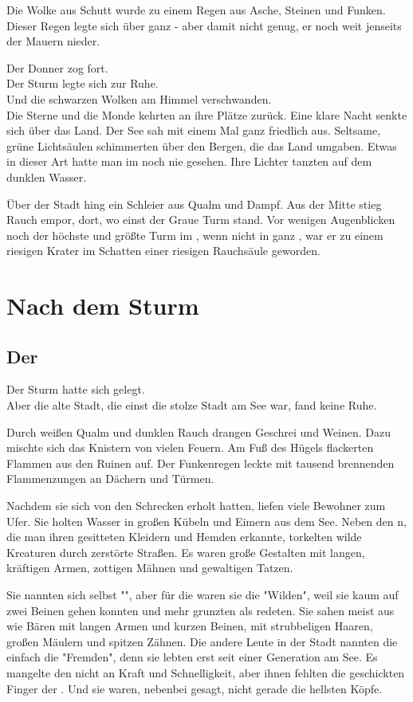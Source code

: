 \begin{huge}
\begin{itshape}
Die Wolke aus Schutt wurde zu einem Regen aus Asche, Steinen und Funken. Dieser Regen legte sich über ganz {\Tern} - aber damit nicht genug, er noch weit jenseits der Mauern nieder.

Der Donner zog fort.\\
Der Sturm legte sich zur Ruhe.\\
Und die schwarzen Wolken am Himmel verschwanden.\\
Die Sterne und die Monde kehrten an ihre Plätze zurück. 
Eine klare Nacht senkte sich über das Land. Der See sah mit einem Mal ganz friedlich aus. Seltsame, grüne Lichtsäulen schimmerten über den Bergen, die das Land umgaben. Etwas in dieser Art hatte man im {\Enland} noch nie gesehen. Ihre Lichter tanzten auf dem dunklen Wasser. 

Über der Stadt hing ein Schleier aus Qualm und Dampf. Aus der Mitte stieg Rauch empor, dort, wo einst der Graue Turm stand. Vor wenigen Augenblicken noch der höchste und größte Turm im {\Enland}, wenn nicht in ganz {\Rhingell}, war er zu einem riesigen Krater im Schatten einer riesigen Rauchsäule geworden.
\end{itshape}

\part{Nach dem Sturm}
\chapter{Der \Schattenlaufer}
Der Sturm hatte sich gelegt.\\
Aber die alte Stadt, die einst die stolze Stadt {\Tern} am See war, fand keine Ruhe.
 
Durch weißen Qualm und dunklen Rauch drangen Geschrei und Weinen. Dazu mischte sich das Knistern von vielen Feuern. Am Fuß des Hügels flackerten Flammen aus den Ruinen auf. Der Funkenregen leckte mit tausend brennenden Flammenzungen an Dächern und Türmen. 

Nachdem sie sich von den Schrecken erholt hatten, liefen viele Bewohner zum Ufer. Sie holten Wasser in großen Kübeln und Eimern aus dem See. Neben den {\Enlaender}{n}, die man ihren gesitteten Kleidern und Hemden erkannte, torkelten wilde Kreaturen durch zerstörte Straßen. Es waren große Gestalten mit langen, kräftigen Armen, zottigen Mähnen und gewaltigen Tatzen.

Sie nannten sich selbst "{\Bangiri}", aber für die {\Enlaender} waren sie die "Wilden", weil sie kaum auf zwei Beinen gehen konnten und mehr grunzten als redeten. Sie sahen meist aus wie Bären mit langen Armen und kurzen Beinen, mit strubbeligen Haaren, großen Mäulern und spitzen Zähnen. Die andere Leute in der Stadt nannten die {\Bangiri} einfach die "Fremden", denn sie lebten erst seit einer Generation am See. Es mangelte den {\Bangiri} nicht an Kraft und Schnelligkeit, aber ihnen fehlten die geschickten Finger der . Und sie waren, nebenbei gesagt, nicht gerade die hellsten Köpfe. 


\end{huge}
